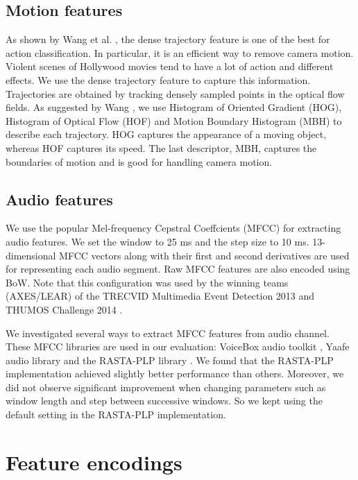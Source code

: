 \subsection{Motion features}
As shown by Wang et al. \cite{wang2013action}, the dense trajectory feature is one of the best for action classification. In particular, it is an efficient way to remove camera motion. Violent scenes of Hollywood movies tend to have a lot of action and different effects. We use the dense trajectory feature to capture this information. Trajectories are obtained by tracking densely sampled points in the optical flow fields. As suggested by Wang \cite{wang2013action}, we use Histogram of Oriented Gradient (HOG), Histogram of Optical Flow (HOF) and Motion Boundary Histogram (MBH) to describe each trajectory. HOG captures the appearance of a moving object, whereas HOF captures its speed. The last descriptor, MBH, captures the boundaries of motion and is good for handling camera motion.


\subsection{Audio features}
We use the popular Mel-frequency Cepstral Coeffcients (MFCC) \cite{rabiner2007introduction} for extracting audio features. We set the window to 25 ms and the step size to 10 ms. 13-dimensional MFCC vectors along with their first and second derivatives are used for representing each audio segment. Raw MFCC features are also encoded using BoW. Note that this configuration was used by the winning teams (AXES/LEAR) of the TRECVID Multimedia Event Detection 2013 \cite{aly2013axes} and THUMOS Challenge 2014 \cite{oneata2014lear}.

We investigated several ways to extract MFCC features from audio channel. These MFCC libraries are used in our evaluation: VoiceBox audio toolkit \cite{voicebox}, Yaafe audio library \cite{mathieu2010yaafe} and the RASTA-PLP library \cite{Ellis05-rastamat}. We found that the RASTA-PLP implementation achieved slightly better performance than others. Moreover, we did not observe significant improvement when changing parameters such as window length and step between successive windows. So we kept using the default setting in the RASTA-PLP implementation.


\section{Feature encodings}
